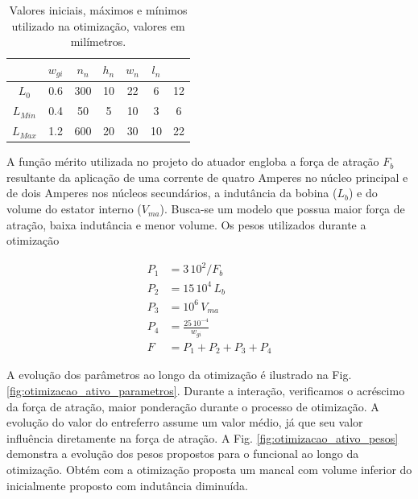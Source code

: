 \begin{table}[ht!]
	\centering
	\begin{tabular}{c c c c c c c}
					 & $w_{gi}$ & $n_n$ & $h_n$ & $w_n$ &  $l_n$   \\ \hline \hline
		$L_{0}$  &  0.6 & 300  &   10 &  22 & 6  &   12 \\
		$L_{Min}$&  0.4 & 50   &   5  &  10 & 3  &   6	\\
		$L_{Max}$ & 1.2 & 600  &   20 &  30 & 10 &   22
	\end{tabular} 
	\caption{Valores iniciais, máximos e mínimos utilizado na otimização, valores em milímetros.}
	\label{tab:ativo:restrições} 
\end{table}

A função mérito utilizada no projeto do atuador engloba a força de atração $F_b$ resultante da aplicação de uma corrente de quatro Amperes no núcleo principal e de dois Amperes nos núcleos secundários, a indutância da bobina ($L_b$) e do volume do estator interno ($V_{ma}$). Busca-se um modelo que possua maior força de atração, baixa indutância e menor volume. Os pesos utilizados durante a otimização 

\begin{align}
	P_1 &= 3 \, 10^2/ F_b \\
	P_2 &= 15 \, 10^4 \, L_b \\
	P_3 &= 10^6 \, V_{ma} \\
	P_4 &= \frac{25 \, 10^{-4}}{w_{gi}}				\\
	F   &= P_1 + P_2 + P_3 + P_4
\end{align}

A evolução dos parâmetros ao longo da otimização é ilustrado na Fig. \ref{fig:otimizacao_ativo_parametros}. Durante a interação, verificamos o acréscimo da força de atração,  maior ponderação durante o processo de otimização.  A evolução do valor do entreferro assume um valor médio, já que seu valor influência diretamente na força de atração. A Fig. \ref{fig:otimizacao_ativo_pesos} demonstra a evolução dos pesos propostos para o funcional ao longo da otimização. Obtém com a otimização proposta um mancal com volume inferior do inicialmente proposto com indutância diminuída.

